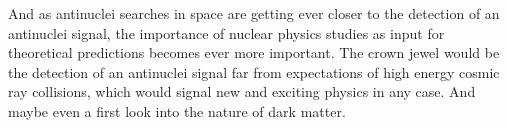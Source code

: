 And as antinuclei searches in space are getting ever closer to the detection of an antinuclei signal, the importance of nuclear physics studies as input for theoretical predictions becomes ever more important. The crown jewel would be the detection of an antinuclei signal far from expectations of high energy cosmic ray collisions, which would signal new and exciting physics in any case. And maybe even a first look into the nature of dark matter. 